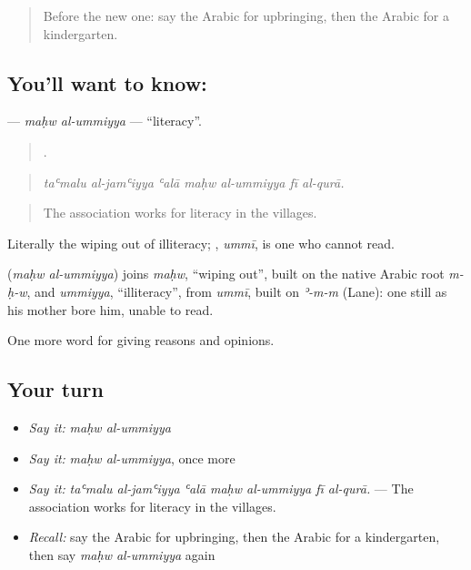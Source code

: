 \label{lesson:AR-C398-mahw-al-ummiyya}



\begin{quote}
Before the new one: say the Arabic for upbringing, then the Arabic for a kindergarten.
\end{quote}

\subsection*{You'll want to know:  }
\textbf{ } — \emph{maḥw al-ummiyya} — \textquotedblleft{}literacy\textquotedblright{}.

\begin{quote}
      .
\end{quote}

\begin{quote}
\emph{taʿmalu al-jamʿiyya ʿalā maḥw al-ummiyya fī al-qurā.}
\end{quote}

\begin{quote}
The association works for literacy in the villages.
\end{quote}

Literally the wiping out of illiteracy; , \emph{ummī}, is one who cannot read.

\begin{cousinweb}
\textbf{ } (\emph{maḥw al-ummiyya}) joins \emph{maḥw}, \textquotedblleft{}wiping out\textquotedblright{}, built on the native Arabic root \emph{m-ḥ-w}, and \emph{ummiyya}, \textquotedblleft{}illiteracy\textquotedblright{}, from \emph{ummī}, built on \emph{ʾ-m-m} (Lane): one still as his mother bore him, unable to read.
\end{cousinweb}

\begin{grammarlens}[title={What you've built}]
One more word for giving reasons and opinions.
\end{grammarlens}

\subsection*{Your turn}
\begin{itemize}
\raggedright
  \item \emph{Say it:} \emph{maḥw al-ummiyya}
  \item \emph{Say it:} \emph{maḥw al-ummiyya}, once more
  \item \emph{Say it:} \emph{taʿmalu al-jamʿiyya ʿalā maḥw al-ummiyya fī al-qurā.} — The association works for literacy in the villages.
  \item \emph{Recall:} say the Arabic for upbringing, then the Arabic for a kindergarten, then say \emph{maḥw al-ummiyya} again
\end{itemize}

